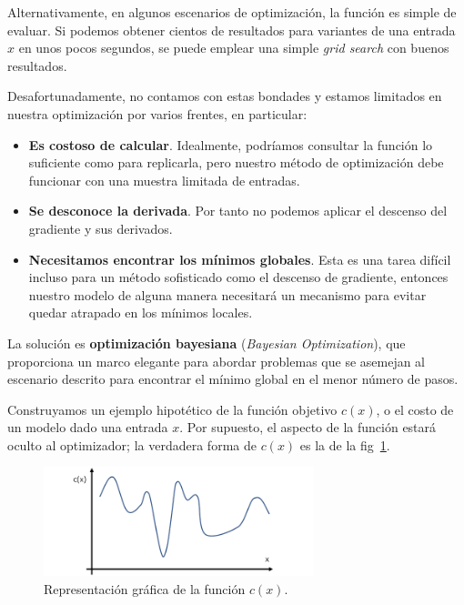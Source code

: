 \documentclass[a4paper,12pt]{article}
\begin{document}
Alternativamente, en algunos escenarios de optimización, la función es simple de evaluar. Si podemos obtener cientos de resultados para variantes de una entrada $x$ en unos pocos segundos, se puede emplear una simple \textit{grid search} con buenos resultados.

Desafortunadamente, no contamos con estas bondades y estamos limitados en nuestra optimización por varios frentes, en particular:
\begin{itemize}[noitemsep, topsep=2pt]
	\item \textbf{Es costoso de calcular}. Idealmente, podríamos consultar la función lo suficiente como para replicarla, pero nuestro método de optimización debe funcionar con una muestra limitada de entradas.
	\item \textbf{Se desconoce la derivada}. Por tanto no podemos aplicar el descenso del gradiente y sus derivados.
	\item \textbf{Necesitamos encontrar los mínimos globales}. Esta es una tarea difícil incluso para un método sofisticado como el descenso de gradiente, entonces nuestro modelo de alguna manera necesitará un mecanismo para evitar quedar atrapado en los mínimos locales.
\end{itemize}

La solución es \textbf{optimización bayesiana} (\textit{Bayesian Optimization}), que proporciona un marco elegante para abordar problemas que se asemejan al escenario descrito para encontrar el mínimo global en el menor número de pasos.

Construyamos un ejemplo hipotético de la función objetivo $c(x)$, o el costo de un modelo dado una entrada $x$. Por supuesto, el aspecto de la función estará oculto al optimizador; la verdadera forma de $c(x)$ es la de la fig~\ref{fig:cx}.

\begin{figure}[H]
	\begin{center}
	\includegraphics[width=0.7\textwidth]{bayes_opt_1.png}
  	\caption{Representación gráfica de la función $c(x)$.}
  	\label{fig:cx}
  	\end{center}
\end{figure}
\end{document}
